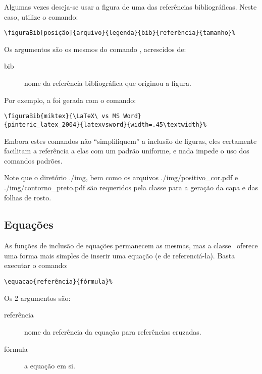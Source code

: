 Algumas vezes deseja-se usar a figura de uma das referências bibliográficas. Neste caso, utilize o 
comando:

\begin{verbatim}
\figuraBib[posição]{arquivo}{legenda}{bib}{referência}{tamanho}%
\end{verbatim}

Os argumentos são os mesmos do comando , acrescidos de:
\begin{description}
	\item[bib] nome da referência bibliográfica que originou a figura.
\end{description}

Por exemplo, a  foi gerada com o comando:
\begin{verbatim}
\figuraBib{miktex}{\LaTeX\ vs MS Word}
{pinteric_latex_2004}{latexvsword}{width=.45\textwidth}%
\end{verbatim}

Embora estes comandos não ``simplifiquem'' a inclusão de figuras, eles certamente facilitam a 
referência a elas com um padrão uniforme, e nada impede o uso dos comandos padrões.

%

Note que o diretório {./img}, bem como os arquivos ./img/positivo_cor.pdf e 
./img/contorno_preto.pdf são requeridos pela classe para a geração da capa e das folhas
de rosto.


\subsection{Equações}
As funções de inclusão de equações permanecem as mesmas, mas a classe \unbene\ oferece uma forma 
mais simples de inserir uma equação (e de referenciá-la). Basta executar o comando:

\begin{verbatim}
\equacao{referência}{fórmula}%
\end{verbatim}

Os 2 argumentos são:
\begin{description}
	\item[referência] nome da referência da equação para referências cruzadas.
	\item[fórmula] a equação em si.
\end{description}

